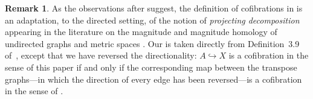 \documentclass[a4paper, 11 pt, oneside, reqno]{amsart}
\numberwithin{lemma}{section}
\theoremstyle{definition}
\newtheorem{remark}[lemma]{Remark}
\newcommand{\demph}[1]{\emph{#1}}
\begin{document}
\begin{remark}\label{rmk:cofib_reverse}
    As the observations after  suggest, the definition of cofibrations in \cite{CDKOSW} is an adaptation, to the directed setting, of the notion of \demph{projecting decomposition} appearing in the literature on the magnitude and magnitude homology of undirected graphs and metric spaces \cite{LeinsterMetric2013, LeinsterGraph, HepworthWillerton2017}. Our  is taken directly from Definition~3.9 of~\cite{CDKOSW}, except that we have reversed the directionality: \(A \hookrightarrow X\) is a cofibration in the sense of this paper if and only if the corresponding map between the transpose graphs---in which the direction of every edge has been reversed---is a cofibration in the sense of \cite{CDKOSW}.


\end{remark}
\end{document}
